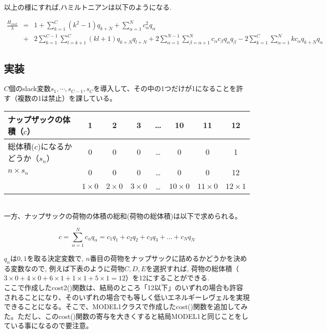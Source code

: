 \documentclass[uplatex,dvipdfmx,a4paper,11pt,oneside,openany]{jsbook}
\begin{document}
以上の様にすれば,ハミルトニアンは以下のようになる.

\begin{eqnarray*}
    \frac{H_{cost}}{\lambda} &=& 1 + \sum _{k=1} ^{C} (k^{2} - 1) q_{k + N} + \sum _{\alpha=1} ^{N} c_{\alpha} ^{2} q_{\alpha}\\
    & +& 2\sum _{k=1} ^{C-1} \sum _{l=k+1}^{C} (kl + 1) q_{k+N}q_{l+N} + 2\sum _{\alpha = 1} ^{N-1} \sum _{\beta = \alpha + 1} ^{N} c_{\alpha} c_{\beta} q_{\alpha} q_{\beta} - 2 \sum_{k=1} ^{C} \sum _{\alpha=1} ^{N} kc_{\alpha} q_{k+N} q_{\alpha}
\end{eqnarray*}

\subsection{実装}

$C$個のslack変数$s_1, \cdots, s_{C-1}, s_C$を導入して、その中の1つだけが1になることを許す（複数の1は禁止）を課している。\\

\begin{tabular}{|l|c|c|c|c|c|c|c|}\hline
  ナップザックの体積（$c$） & 1 & 2 & 3 & \dots & 10 & 11 & 12 \\\hline
  総体積($c$)になるかどうか（$s_n$） & 0 & 0 & 0 & \dots & 0 & 0 & 1 \\\hline
  $n\times s_n$ & 0 & 0 & 0 & \dots & 0 & 0 & 12 \\
  & $1\times 0$ & $2\times 0$ & $3\times 0$ & \dots & $10\times 0$ & $11\times 0$ & $12\times 1$ \\\hline
 \end{tabular}\\

一方、ナップサックの荷物の体積の総和(荷物の総体積)は以下で求められる。

\[
c = \sum_{\alpha=1}^{N}c_\alpha q_\alpha = c_1 q_1 + c_2 q_2 + c_3 q_3 + \dots + c_N q_N
\]

$q_n$は$0,1$を取る決定変数で, $n$番目の荷物をナップサックに詰めるかどうかを決める変数なので, 例えば下表のように荷物$C,D,E$を選択すれば, 荷物の総体積（$3\times 0+4\times 0+6\times 1+1\times 1+5\times 1=12$）を12にすることができる.\\



ここで作成したcost2()関数は、結局のところ「12以下」のいずれの場合も許容されることになり、そのいずれの場合でも等しく低いエネルギーレヴェルを実現できることになる。そこで、MODEL1クラスで作成したcost()関数を追加してみた。ただし、このcost()関数の寄与を大きくすると結局MODEL1と同じことをしている事になるので要注意。
\end{document}
